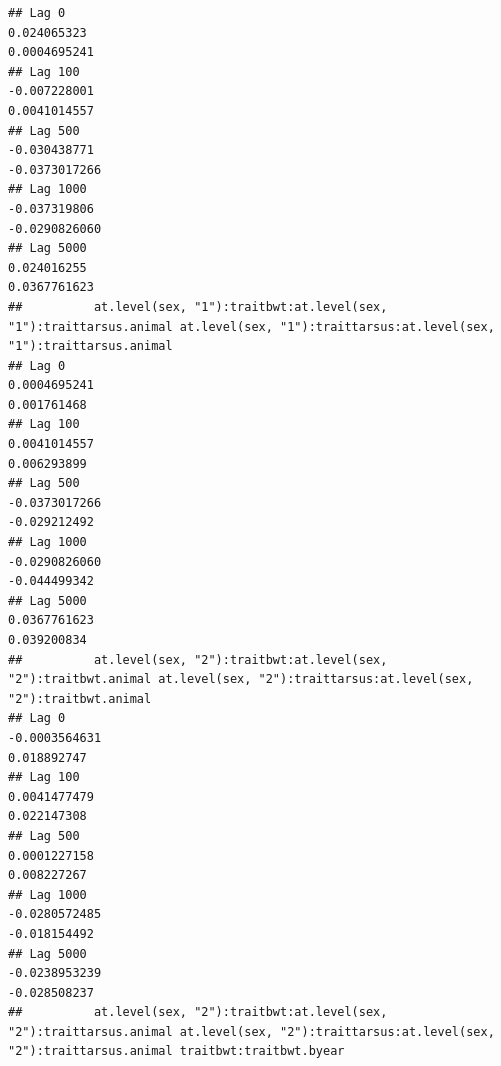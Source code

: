 \documentclass[
  12pt,
]{book}
\begin{document}
\begin{verbatim}
## Lag 0                                                       0.024065323                                                      0.0004695241
## Lag 100                                                    -0.007228001                                                      0.0041014557
## Lag 500                                                    -0.030438771                                                     -0.0373017266
## Lag 1000                                                   -0.037319806                                                     -0.0290826060
## Lag 5000                                                    0.024016255                                                      0.0367761623
##          at.level(sex, "1"):traitbwt:at.level(sex, "1"):traittarsus.animal at.level(sex, "1"):traittarsus:at.level(sex, "1"):traittarsus.animal
## Lag 0                                                         0.0004695241                                                          0.001761468
## Lag 100                                                       0.0041014557                                                          0.006293899
## Lag 500                                                      -0.0373017266                                                         -0.029212492
## Lag 1000                                                     -0.0290826060                                                         -0.044499342
## Lag 5000                                                      0.0367761623                                                          0.039200834
##          at.level(sex, "2"):traitbwt:at.level(sex, "2"):traitbwt.animal at.level(sex, "2"):traittarsus:at.level(sex, "2"):traitbwt.animal
## Lag 0                                                     -0.0003564631                                                       0.018892747
## Lag 100                                                    0.0041477479                                                       0.022147308
## Lag 500                                                    0.0001227158                                                       0.008227267
## Lag 1000                                                  -0.0280572485                                                      -0.018154492
## Lag 5000                                                  -0.0238953239                                                      -0.028508237
##          at.level(sex, "2"):traitbwt:at.level(sex, "2"):traittarsus.animal at.level(sex, "2"):traittarsus:at.level(sex, "2"):traittarsus.animal traitbwt:traitbwt.byear

\end{verbatim}
\end{document}
